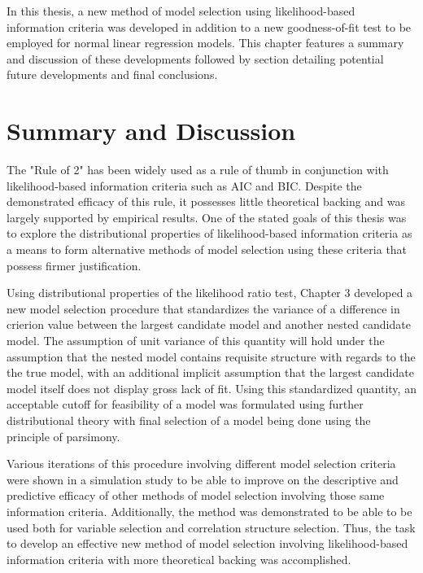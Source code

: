 \doublespace
{}

		In this thesis, a new method of model selection using likelihood-based information criteria was developed in addition to a new goodness-of-fit test
		to be employed for normal linear regression models. This chapter features a summary and discussion of these developments followed by section
		detailing potential future developments and final conclusions. 

		\section{Summary and Discussion}

		The "Rule of 2" has been widely used as a rule of thumb in conjunction with likelihood-based information criteria such as AIC and BIC. Despite the
		demonstrated efficacy of this rule, it possesses little theoretical backing and was largely supported by empirical results. One of the stated
		goals of this thesis was to explore the distributional properties of likelihood-based information criteria as a means to form alternative methods of
		model selection using these criteria that possess firmer justification.
		
		Using distributional properties of the likelihood ratio test, Chapter 3 developed a new model selection procedure that standardizes the variance of
		a difference in crierion value between the largest candidate model and another nested candidate model. The assumption of unit variance of this
		quantity will hold under the assumption that the nested model contains requisite structure with regards to the the true model, with an additional
		implicit assumption that the largest candidate model itself does not display gross lack of fit. Using this standardized quantity, an acceptable
		cutoff for feasibility of a model was formulated using further distributional theory with final selection of a model being done using the principle
		of parsimony.

		Various iterations of this procedure involving different model selection criteria were shown in a simulation study to be able to improve on the descriptive
		and predictive efficacy of other methods of model selection involving those same information criteria.  Additionally, the method was demonstrated to
		be able to be used both for variable selection and correlation structure selection. Thus, the task to develop an effective new method of model selection
		involving likelihood-based information criteria with more theoretical backing was accomplished.


